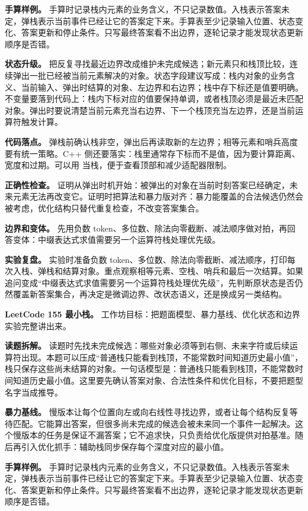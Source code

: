 \textbf{手算样例。} 手算时记录栈内元素的业务含义，不只记录数值。入栈表示答案未定，弹栈表示当前事件已经让它的答案定下来。手算表至少记录输入位置、状态变化、答案更新和停止条件。只写最终答案看不出边界，逐轮记录才能发现状态更新顺序是否错。

\textbf{状态升级。} 把反复寻找最近边界改成维护未完成候选；新元素只和栈顶比较，连续弹出一批已经被当前元素解决的对象。状态字段建议写成：栈内对象的业务含义、当前输入、弹出时结算的对象、左边界和右边界；栈中存下标还是值要明确。不变量要落到代码上：栈内下标对应的值要保持单调，或者栈顶必须是最近未匹配对象。弹出时要说清楚当前元素充当右边界、下一个栈顶充当左边界，还是当前运算符触发计算。

\textbf{代码落点。} 弹栈前确认栈非空，弹出后再读取新的左边界；相等元素和哨兵高度要有统一策略。C++ 侧还要落实：栈里通常存下标而不是值，因为要计算距离、宽度和过期。可以用  当栈，便于查看顶部和减少适配器限制。

\textbf{正确性检查。} 证明从弹出时机开始：被弹出的对象在当前时刻答案已经确定，未来元素无法再改变它。证明时把算法和暴力版对齐：暴力能覆盖的合法候选仍然会被考虑，优化结构只替代重复检查，不改变答案集合。

\textbf{边界和变体。} 先用负数 token、多位数、除法向零截断、减法顺序做对拍，再回答变体：中缀表达式求值需要另一个运算符栈处理优先级。

\textbf{实验复盘。} 实验时准备负数 token、多位数、除法向零截断、减法顺序，打印每次入栈、弹栈和结算对象。重点观察相等元素、空栈、哨兵和最后一次结算。如果追问变成“中缀表达式求值需要另一个运算符栈处理优先级”，先判断原状态是否仍然覆盖新答案集合，再决定是微调边界、改状态语义，还是换成另一类结构。

\noindent\textbf{LeetCode 155 最小栈。} 工作坊目标：把题面模型、暴力基线、优化状态和边界实验完整讲出来。

\textbf{读题拆解。} 读题时先找未完成候选：哪些对象必须等到右侧、未来字符或后续运算符出现。本题可以压成“普通栈只能看到栈顶，不能常数时间知道历史最小值”，栈只保存这些尚未结算的对象。一句话模型是：普通栈只能看到栈顶，不能常数时间知道历史最小值。这里要先确认答案对象、合法性条件和优化目标，不要把题型名字当成推导。

\textbf{暴力基线。} 慢版本让每个位置向左或向右线性寻找边界，或者让每个结构反复等待匹配。它能算出答案，但很多尚未完成的候选会被未来同一个事件一起解决。这个慢版本的任务是保证不漏答案；它不追求快，只负责给优化版提供对拍基准。随后再引入优化抓手：辅助栈同步保存每个深度对应的最小值。

\textbf{手算样例。} 手算时记录栈内元素的业务含义，不只记录数值。入栈表示答案未定，弹栈表示当前事件已经让它的答案定下来。手算表至少记录输入位置、状态变化、答案更新和停止条件。只写最终答案看不出边界，逐轮记录才能发现状态更新顺序是否错。

